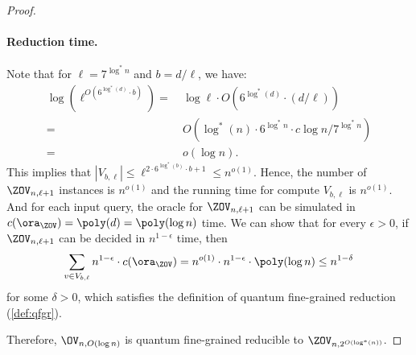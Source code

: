 \begin{proof}
\paragraph*{Reduction time.} Note that for $\ell=7^{\log^* n}$ and $b=d/\ell$, we have:
\begin{align}
    \log\left( \ell^{O(6^{\log^* (d)}\cdot b)} \right) = &~ \log \ell \cdot O\left( 6^{\log^* (d)}\cdot (d/\ell) \right)\\
    =&~ O\left( \log^* (n)\cdot 6^{\log^* n} \cdot c\log n / 7^{\log^* n} \right)\\
    =&~ o(\log n).
\end{align}
This implies that $|V_{b,\ell}|\leq \ell^{2\cdot 6^{\log^* (b)}\cdot b+1} \leq n^{o(1)}$.
Hence, the number of $\ZOV_{n,\ell+1}$ instances is $n^{o(1)}$ and the running time for compute $V_{b,\ell}$ is $n^{o(1)}$. And for each input query, the oracle for $\ZOV_{n,\ell+1}$ can be simulated in $c(\ora_{\ZOV})=\poly(d)=\poly(\log n)$ time. We can show that for every $\epsilon>0$, if $\ZOV_{n,\ell+1}$ can be decided in $n^{1-\epsilon}$ time, then
\begin{align}
    \sum_{v\in V_{b,\ell}} n^{1-\epsilon}\cdot c(\ora_{\ZOV})=n^{o(1)}\cdot n^{1-\epsilon}\cdot \poly(\log n) \leq n^{1-\delta}
\end{align}
for some $\delta > 0$, which satisfies the definition of quantum fine-grained reduction (\cref{def:qfgr}).

Therefore, $\OV_{n,O(\log n)}$ is quantum fine-grained reducible to $\ZOV_{n,2^{O(\log^* (n))}}$.
\end{proof}

